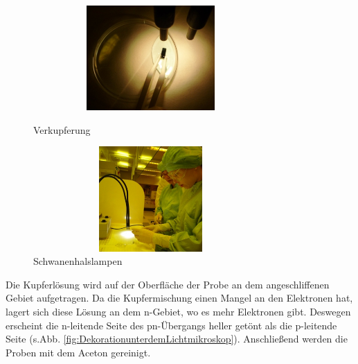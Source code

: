 \begin{figure}[H]
\centering
\begin{minipage}[hbt]{6cm}
    \centering
    \includegraphics[width=0.8\textwidth, height=4cm]{bilder/Verkupferung.png}
  \caption{Verkupferung}
  \label{fig:Verkupferung}
\end{minipage}
\hfill
\begin{minipage}[hbt]{7cm}
    \centering
    \includegraphics[width=0.8\textwidth,height=4cm]{bilder/Schwanenhalslampen.png}
  \caption{Schwanenhalslampen}
  \label{fig:Schwanenhalslampen}
\end{minipage}

\end{figure}



Die Kupferlösung wird auf der Oberfläche der Probe an dem angeschliffenen Gebiet aufgetragen. Da die Kupfermischung einen Mangel an den Elektronen hat, lagert sich diese Lösung an dem n-Gebiet, wo es mehr Elektronen gibt. Deswegen erscheint die n-leitende Seite des pn-Übergangs heller getönt als die p-leitende Seite (s.Abb. \ref{fig:DekorationunterdemLichtmikroskop}). Anschließend werden die Proben mit dem Aceton gereinigt.

